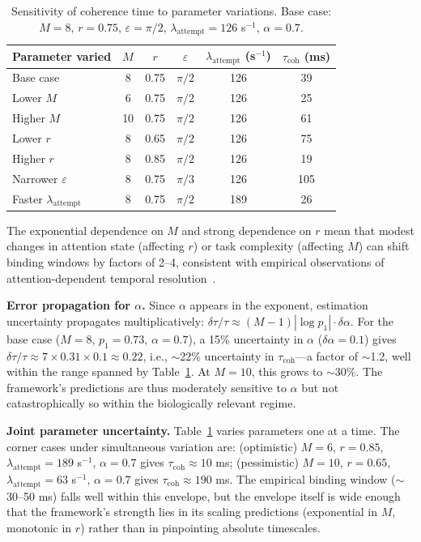 \documentclass[12pt]{article}
\begin{document}
\begin{table}[H]
\centering
\caption{Sensitivity of coherence time to parameter variations. Base case: $M=8$, $r=0.75$, $\varepsilon=\pi/2$, $\lambda_{\mathrm{attempt}} = 126$ s$^{-1}$, $\alpha=0.7$.}
\label{tab:sensitivity}
\begin{tabular}{lccccc}
\toprule
Parameter varied & $M$ & $r$ & $\varepsilon$ & $\lambda_{\mathrm{attempt}}$ (s$^{-1}$) & $\tau_{\mathrm{coh}}$ (ms) \\
\midrule
Base case & 8 & 0.75 & $\pi/2$ & 126 & 39 \\
Lower $M$ & 6 & 0.75 & $\pi/2$ & 126 & 25 \\
Higher $M$ & 10 & 0.75 & $\pi/2$ & 126 & 61 \\
Lower $r$ & 8 & 0.65 & $\pi/2$ & 126 & 75 \\
Higher $r$ & 8 & 0.85 & $\pi/2$ & 126 & 19 \\
Narrower $\varepsilon$ & 8 & 0.75 & $\pi/3$ & 126 & 105 \\
Faster $\lambda_{\mathrm{attempt}}$ & 8 & 0.75 & $\pi/2$ & 189 & 26 \\
\bottomrule
\end{tabular}
\end{table}

The exponential dependence on $M$ and strong dependence on $r$ mean that modest changes in attention state (affecting $r$) or task complexity (affecting $M$) can shift binding windows by factors of 2--4, consistent with empirical observations of attention-dependent temporal resolution~\cite{samaha2015}.

\textbf{Error propagation for $\alpha$.} Since $\alpha$ appears in the exponent, estimation uncertainty propagates multiplicatively: $\delta\tau/\tau \approx (M-1)|\log p_1| \cdot \delta\alpha$. For the base case ($M = 8$, $p_1 = 0.73$, $\alpha = 0.7$), a 15\% uncertainty in $\alpha$ ($\delta\alpha = 0.1$) gives $\delta\tau/\tau \approx 7 \times 0.31 \times 0.1 \approx 0.22$, i.e., $\sim$22\% uncertainty in $\tau_{\mathrm{coh}}$---a factor of $\sim$1.2, well within the range spanned by Table~\ref{tab:sensitivity}. At $M = 10$, this grows to $\sim$30\%. The framework's predictions are thus moderately sensitive to $\alpha$ but not catastrophically so within the biologically relevant regime.

\textbf{Joint parameter uncertainty.} Table~\ref{tab:sensitivity} varies parameters one at a time. The corner cases under simultaneous variation are: (optimistic) $M = 6$, $r = 0.85$, $\lambda_{\mathrm{attempt}} = 189$ s$^{-1}$, $\alpha = 0.7$ gives $\tau_{\mathrm{coh}} \approx 10$ ms; (pessimistic) $M = 10$, $r = 0.65$, $\lambda_{\mathrm{attempt}} = 63$ s$^{-1}$, $\alpha = 0.7$ gives $\tau_{\mathrm{coh}} \approx 190$ ms. The empirical binding window ($\sim$30--50 ms) falls well within this envelope, but the envelope itself is wide enough that the framework's strength lies in its scaling predictions (exponential in $M$, monotonic in $r$) rather than in pinpointing absolute timescales.
\end{document}
